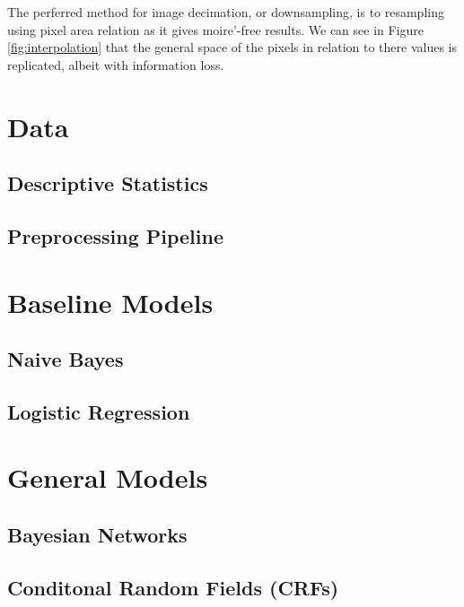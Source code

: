 \documentclass{article}
\begin{document}
The perferred method for image decimation, or downsampling, is to
resampling using pixel area relation as it gives moire'-free results. We can
see in Figure \ref{fig:interpolation} that the general space of the pixels in
relation to there values is replicated, albeit with information loss.



\section{Data}
\label{sec:data}
\subsection{Descriptive Statistics}
\label{sec:stats}
\subsection{Preprocessing Pipeline}
\label{sec:pipeline}



\section{Baseline Models}
\label{sec:baseline-models}
\subsection{Naive Bayes}
\label{sec:NB}
\subsection{Logistic Regression}
\label{sec:LR}
\section{General Models}
\label{sec:general-models}
\subsection{Bayesian Networks}
\label{sec:GBN}
\subsection{Conditonal Random Fields (CRFs)}
\label{sec:CRF}
\end{document}
